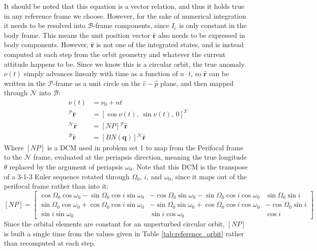 \documentclass[titlepage]{article}
\begin{document}
It should be noted that this equation is a vector relation, and thus it holds true in any reference frame we choose. However, for the sake of numerical integration it needs to be resolved into $\mathcal{B}$-frame components, since $I_c$ is only constant in the body frame. This means the unit position vector $\hat{\boldsymbol{r}}$ also needs to be expressed in body components. However, $\hat{\boldsymbol{r}}$ is not one of the integrated states, and is instead computed at each step from the orbit geometry and whatever the current attitude happens to be. Since we know this is a circular orbit, the true anomaly $\nu(t)$ simply advances linearly with time as a function of $n\cdot t$, so $\hat{\boldsymbol{r}}$ can be written in the $\mathcal{P}$-frame as a unit circle on the $\hat{e}-\hat{p}$ plane, and then mapped through $\mathcal{N}$ into $\mathcal{B}$:
\begin{equation}
	\begin{split}
		\nu(t)&=\nu_0+nt \\
		{}^{\mathcal{P}}\hat{\boldsymbol{r}}&=\left[\cos\nu(t),\ \sin\nu(t),\ 0\right]^T \\
		{}^{\mathcal{N}}\hat{\boldsymbol{r}}&=\left[NP\right]{}^{\mathcal{P}}\hat{\boldsymbol{r}} \\
		{}^{\mathcal{B}}\hat{\boldsymbol{r}}&=\left[BN(\boldsymbol{q})\right]{}^{\mathcal{N}}\hat{\boldsymbol{r}}
	\end{split}
\end{equation}
Where $\left[NP\right]$ is a DCM used in problem set 1 to map from the Perifocal frame to the $\mathcal{N}$ frame, evaluated at the periapsis direction, meaning the true longitude $\theta$ replaced by the argument of periapsis $\omega_0$. Note that this DCM is the transpose of a 3-1-3 Euler sequence rotated through $\Omega_0$, $i$, and $\omega_0$, since it maps out of the perifocal frame rather than into it:
\tiny
\begin{equation}
	\left[NP\right]=
	\left[
	\begin{matrix}
		\cos{\Omega_0}\cos{\omega_0}-\sin{\Omega_0}\cos{i}\sin{\omega_0} & -\cos{\Omega_0}\sin{\omega_0}-\sin{\Omega_0}\cos{i}\cos{\omega_0} & \sin{\Omega_0}\sin{i}\\
		\sin{\Omega_0}\cos{\omega_0}+\cos{\Omega_0}\cos{i}\sin{\omega_0} & -\sin{\Omega_0}\sin{\omega_0}+\cos{\Omega_0}\cos{i}\cos{\omega_0} & -\cos{\Omega_0}\sin{i}\\
		\sin{i}\sin{\omega_0} & \sin{i}\cos{\omega_0} & \cos{i}
	\end{matrix}
	\right]
\end{equation}
\normalsize
Since the orbital elements are constant for an unperturbed circular orbit, $\left[NP\right]$ is built a single time from the values given in Table \ref{tab:reference_orbit} rather than recomputed at each step.\\
\end{document}
